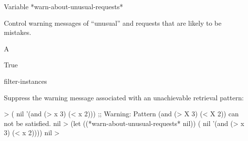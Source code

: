 \documentclass[10pt,twoside,english,pdftex]{article}
\begin{document}
\begin{functiondoc}{Variable}%
{*warn-about-unusual-requests*}{}%

\fnsyntax

\fnpurpose Control warning messages of ``unusual''
 and
 requests that are likely to be
mistakes.

\fnpackage {}

\fnmodule {}

\fnvaluetype A 

\fninitialvalue True

\begin{alsos}{filter-instances}
\end{alsos}

\fnexample
Suppress the warning message associated with an unachievable retrieval pattern:
%
\W\supp
\begin{example}
  > ( nil '(and (> x 3) (< x 2)))
  ;; Warning: Pattern (and (> X 3) (< X 2)) can not be satisfied.
  nil
  > (let ((*warn-about-unusual-requests* nil))
      ( nil '(and (> x 3) (< x 2))))
  nil
  >
\end{example}

\end{functiondoc}

\end{document}
